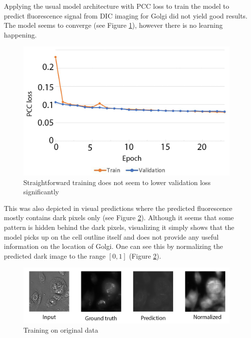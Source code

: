 Applying the usual model architecture with PCC loss to train the model to predict fluorescence signal from DIC imaging for Golgi did not yield good results. The model seems to converge (see Figure \ref{fig:golgi-no-reg-pcc}), however there is no learning happening.
\begin{figure}[H]
	\begin{center}
		\includegraphics[width=0.5\linewidth]{bilder/golgi/pcc-no-reg.png}
		\caption{Straightforward training does not seem to lower validation loss significantly}\label{fig:golgi-no-reg-pcc}
	\end{center}
\end{figure}

This was also depicted in visual predictions where the predicted fluorescence mostly contains dark pixels only (see Figure \ref{fig:golgi-no-reg-pcc-predictions}). Although it seems that some pattern is hidden behind the dark pixels, visualizing it simply shows that the model picks up on the cell outline itself and does not provide any useful information on the location of Golgi. One can see this by normalizing the predicted dark image to the range $[0,1]$ (Figure \ref{fig:golgi-no-reg-pcc-predictions}).
\begin{figure}[htb]
	\begin{center}
		\includegraphics[width=0.8\linewidth]{bilder/golgi/too-dark.png}
		\caption{Training on original data}\label{fig:golgi-no-reg-pcc-predictions}
	\end{center}
\end{figure}

